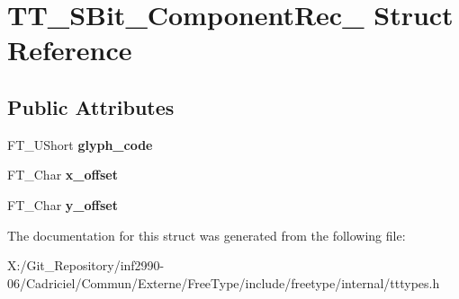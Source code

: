 \hypertarget{struct_t_t___s_bit___component_rec__}{\section{T\-T\-\_\-\-S\-Bit\-\_\-\-Component\-Rec\-\_\- Struct Reference}
\label{struct_t_t___s_bit___component_rec__}
}
\subsection*{Public Attributes}
\begin{DoxyCompactItemize}
\item 
\hypertarget{struct_t_t___s_bit___component_rec___a357eef9c05c65034b506cdd48271e562}{F\-T\-\_\-\-U\-Short {\bfseries glyph\-\_\-code}}\label{struct_t_t___s_bit___component_rec___a357eef9c05c65034b506cdd48271e562}

\item 
\hypertarget{struct_t_t___s_bit___component_rec___a97799704aa59bf737e274289fa70ca3f}{F\-T\-\_\-\-Char {\bfseries x\-\_\-offset}}\label{struct_t_t___s_bit___component_rec___a97799704aa59bf737e274289fa70ca3f}

\item 
\hypertarget{struct_t_t___s_bit___component_rec___af24f91b7d5e0268a223514ad68a9a10b}{F\-T\-\_\-\-Char {\bfseries y\-\_\-offset}}\label{struct_t_t___s_bit___component_rec___af24f91b7d5e0268a223514ad68a9a10b}

\end{DoxyCompactItemize}


The documentation for this struct was generated from the following file\-:\begin{DoxyCompactItemize}
\item 
X\-:/\-Git\-\_\-\-Repository/inf2990-\/06/\-Cadriciel/\-Commun/\-Externe/\-Free\-Type/include/freetype/internal/tttypes.\-h\end{DoxyCompactItemize}
